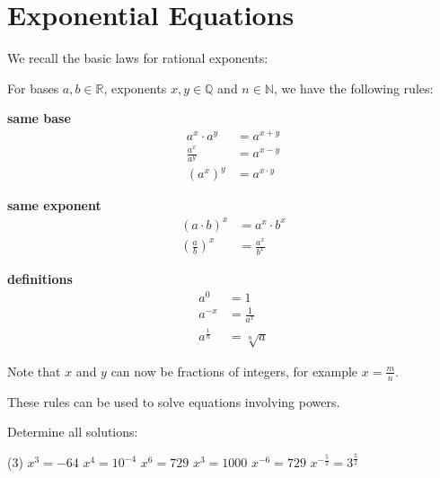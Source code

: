 \section*{Exponential Equations}
We recall the basic laws for rational exponents:
\begin{tcolorbox}
	For bases $a,b\in\mathbb R$, exponents $x,y\in\mathbb Q$ and $n\in\mathbb N$, we have the following rules:
	\begin{multicols}{3}
		\centering
		\textbf{same base}\\
		\begin{align*}
			a^x\cdot a^y&=a^{x+y} \\[8pt]
			\frac{a^x}{a^y}&=a^{x-y} \\[8pt]
			\left(a^x\right)^y&=a^{x\cdot y}
		\end{align*}
		\vfill
		\columnbreak
		
		\textbf{same exponent}\\
		\begin{align*}
			\left(a\cdot b\right)^x&=a^x\cdot b^x \\[8pt]
			\left(\frac{a}{b}\right)^x&=\frac{a^x}{b^x}
		\end{align*}
		\vfill
		\columnbreak
		
		\textbf{definitions}\\
		\begin{align*}
			a^0&=1 \\[8pt]
			a^{-x}&=\frac{1}{a^x} \\[8pt]
			a^{\frac{1}{n}}&=\sqrt[n]{a}
		\end{align*}
		\vfill
	\end{multicols}
	Note that $x$ and $y$ can now be fractions of integers, for example $x=\frac{m}{n}$.
\end{tcolorbox}
These rules can be used to solve equations involving powers.
\begin{exercise}
	Determine all solutions:
	\begin{tasks}(3)
		\task $x^3=-64$
		\task $x^4=10^{-4}$
		\task $x^6=729$
		\task $x^3=1000$
		\task $x^{-6}=729$
		\task $x^{-\frac{5}{2}}=3^{\frac{5}{2}}$
	\end{tasks}
\end{exercise}
